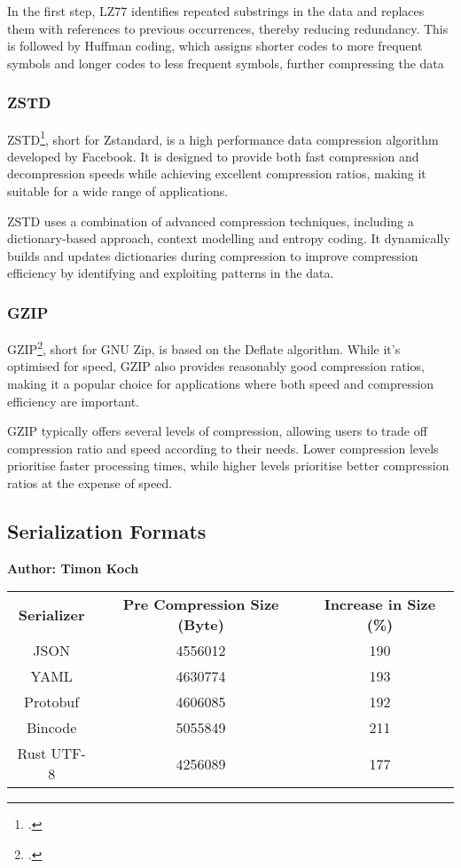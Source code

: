 In the first step, LZ77 identifies repeated substrings in the data and replaces them with references to previous occurrences, thereby reducing redundancy. This is followed by Huffman coding, which assigns shorter codes to more frequent symbols and longer codes to less frequent symbols, further compressing the data

\subsubsection{ZSTD}
ZSTD\footcite{zstd}, short for Zstandard, is a high performance data compression algorithm developed by Facebook. It is designed to provide both fast compression and decompression speeds while achieving excellent compression ratios, making it suitable for a wide range of applications.

ZSTD uses a combination of advanced compression techniques, including a dictionary-based approach, context modelling and entropy coding. It dynamically builds and updates dictionaries during compression to improve compression efficiency by identifying and exploiting patterns in the data.

\subsubsection{GZIP}
GZIP\footcite{gzip}, short for GNU Zip, is based on the Deflate algorithm. While it's optimised for speed, GZIP also provides reasonably good compression ratios, making it a popular choice for applications where both speed and compression efficiency are important.

GZIP typically offers several levels of compression, allowing users to trade off compression ratio and speed according to their needs. Lower compression levels prioritise faster processing times, while higher levels prioritise better compression ratios at the expense of speed.

\subsection{Serialization Formats}
\textbf{Author: Timon Koch}



\begin{table}[]
\begin{tabular}{ccc}
\textbf{Serializer} & \textbf{Pre Compression Size (Byte)} & \textbf{Increase in Size (\%)} \\
JSON       & 4556012 & 190 \\
YAML       & 4630774 & 193 \\
Protobuf   & 4606085 & 192 \\
Bincode    & 5055849 & 211 \\
Rust UTF-8 & 4256089 & 177
\end{tabular}
\end{table}




